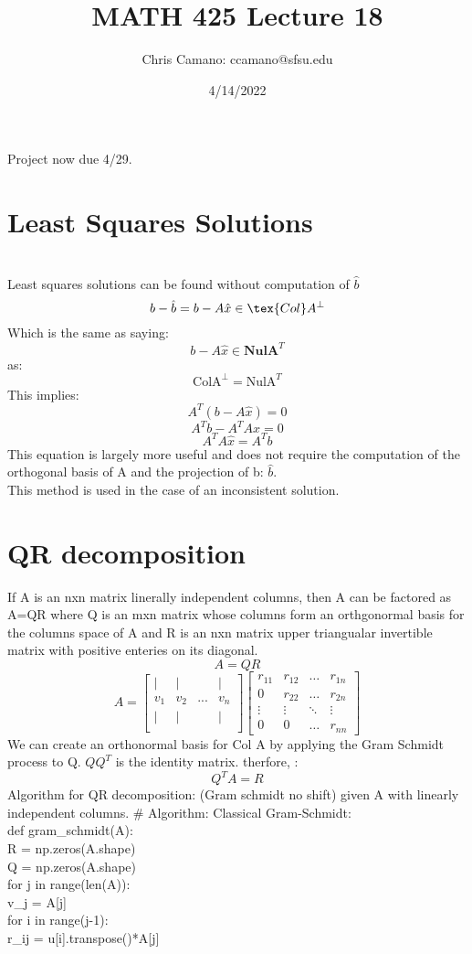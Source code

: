 \documentclass[12pt]{article}
\author{Chris Camano: ccamano@sfsu.edu}
\title{MATH 425  Lecture 18 }
\date{4/14/2022}
\newcommand{\sect}[1]{\section*{#1}}
\begin{document}
\maketitle
Project now due 4/29.
\sect{Least Squares Solutions}\\
Least squares solutions can be found without computation of $\hat{b}$\\
\[
  b-\hat{b}=b-A\hat{x}\in \tex{Col}A^\perp
\]
Which is the same as saying:
\[
  b-A\hat{x}\in \textbf{NulA}^T
\]
as:
\[
  \text{ColA}^\perp=\text{NulA}^T
\]
This implies:
\[
  A^T(b-A\hat{x})=0
\]
\[
  A^Tb-A^TA\hat{x}=0
\]
\[
  A^TA\hat{x}=A^Tb
\]
This equation is largely more useful and does not require the computation of the orthogonal basis of A and the projection of b: $\hat{b}$.\\
This method is used in the case of an inconsistent solution.
\sect{QR decomposition}
If A is an nxn matrix linerally independent columns, then A can be factored as A=QR where Q is an  mxn matrix whose columns form an orthgonormal basis for the columns space of A and R is an nxn matrix upper triangualar invertible matrix with positive enteries on its diagonal.
\[
  A=QR
\]
\[
  A=\begin{bmatrix}
    |&|&&|\\
    v_1&v_2&...&v_n\\
    |&|&&|\\
\end{bmatrix}
\begin{bmatrix}
  r_{11}&r_{12}&\hdots&r_{1n}\\
  0&r_{22}&\hdots&r_{2n}\\
  \vdots&\vdots&\ddots&\vdots\\
  0&0&\hdots&  r_{nn}
\end{bmatrix}
\]
We can create an orthonormal basis for Col A by applying the Gram Schmidt process to Q. $QQ^T$ is the identity matrix. therfore, :
\[
  Q^TA=R
\]
Algorithm for QR decomposition: (Gram schmidt no shift) given A with linearly independent columns.
# Algorithm: Classical Gram-Schmidt:\\
def gram_schmidt(A):\\
    R = np.zeros(A.shape)\\
    Q = np.zeros(A.shape)\\
    for j in range(len(A)):\\
        v_j = A[j]\\
        for i in range(j-1):\\
            r_ij = u[i].transpose()*A[j]\\
\end{document}
